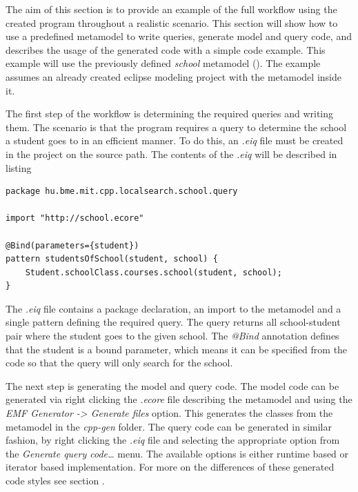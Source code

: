 The aim of this section is to provide an example of the full workflow using the
created program throughout a realistic scenario. This section will show how to
use a predefined metamodel to write queries, generate model and query code, and
describes the usage of the generated code with a simple code example. This
example will use the previously defined \emph{school} metamodel
(). The example assumes an already created
eclipse modeling project with the metamodel inside it.

The first step of the workflow is determining the required queries and writing
them. The scenario is that the \CPP{} program requires a query to determine the
school a student goes to in an efficient manner. To do this, an \emph{.eiq} file
must be created in the project on the source path. The contents of the
\emph{.eiq} will be described in listing 

\begin{lstlisting}[frame=single,float=!ht,language=IQPL,
label=listing:example_school_eiq, caption=The \emph{.eiq} file for the example
project] 
package hu.bme.mit.cpp.localsearch.school.query

import "http://school.ecore"

@Bind(parameters={student})
pattern studentsOfSchool(student, school) {
	Student.schoolClass.courses.school(student, school);
}
\end{lstlisting}

The \emph{.eiq} file contains a package declaration, an import to the metamodel
and a single pattern defining the required query. The query returns all
school-student pair where the student goes to the given school. The \emph{@Bind}
annotation defines that the student is a bound parameter, which means it can be
specified from the code so that the query will only search for the school.

The next step is generating the model and query code. The model code can be
generated via right clicking the \emph{.ecore} file describing the metamodel
and using the \emph{EMF Generator -> Generate \CPP{} files} option. This generates
the \CPP{} classes from the metamodel in the \emph{cpp-gen} folder. The query
code can be generated in similar fashion, by right clicking the \emph{.eiq} file
and selecting the appropriate option from the \emph{Generate query code\ldots}
menu. The available options is either runtime based or iterator based
implementation. For more on the differences of these generated code styles see
section .


